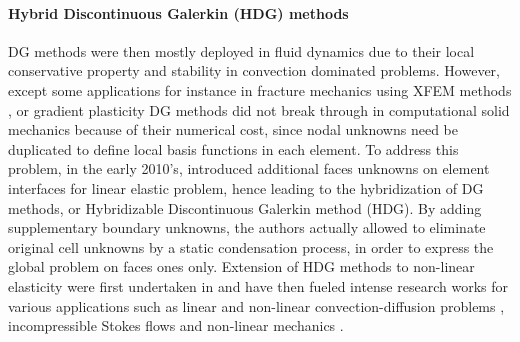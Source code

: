 
\paragraph{Hybrid Discontinuous Galerkin (HDG) methods}

DG methods were then mostly deployed in fluid dynamics \cite{shahbazi_high-order_2007, persson_discontinuous_2009} due to
their local conservative property and stability in convection dominated problems.
However, except some applications for instance in fracture mechanics using XFEM methods
\cite{gracie_blending_2008, shen_stability_2010},
or gradient plasticity \cite{djoko_discontinuous_2007,djoko_discontinuous_2007-1} DG methods did not break through
in computational solid mechanics because of their numerical cost, since nodal unknowns need be duplicated to define local basis functions in each element.
To address this problem, in the early 2010's, \cite{cockburn_unified_2009, soon_hybridizable_2009} introduced additional
faces unknowns on element interfaces for linear elastic problem, hence leading to the hybridization of DG methods,
or Hybridizable Discontinuous Galerkin method (HDG).
By adding supplementary boundary unknowns, the authors actually allowed to
eliminate original cell unknowns by a static condensation process, in order to express the global problem on faces ones only.
% 
% 
Extension of HDG methods to non-linear elasticity were first undertaken in \cite{soon_hybridizable_2008} and have then fueled intense research works for various applications such as linear and non-linear convection-diffusion problems \cite{nguyen_implicit_2009,nguyen_implicit_2009-1,nguyen_hybridizable_2010}, incompressible Stokes flows \cite{nguyen_hybridizable_2010, nguyen_implicit_2011} and non-linear mechanics \cite{nguyen_hybridizable_2012}.

